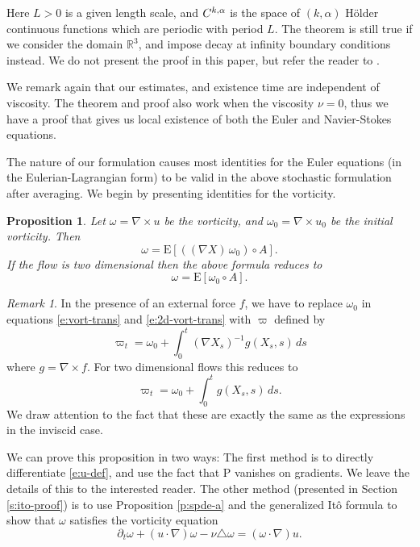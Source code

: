 \documentclass[final]{amsart}%
\newcommand{\del}{\partial}
\newcommand{\lap}{\triangle}
\newcommand{\inv}{^{-1}}
\newcommand{\grad}{\nabla}
\newcommand{\curl}{\grad \times}
\newcommand{\E}{\boldsymbol{\mathrm{E}}}
\newcommand{\lhp}{\boldsymbol{\mathrm{P}}}
\newcommand{\D}[2][u]{\del_t #2 + \left(#1 \cdot \grad\right) #2 - \nu \lap #2}
\newcommand{\R}{\mathbb{R}}
\newcommand{\holderspace}[2]{\ensuremath{C^{\ifx0#1{#2}\else{#1,#2}\fi}}}
\numberwithin{equation}{section}
\newtheorem{prop}[theorem]{Proposition}
\theoremstyle{definition}
\theoremstyle{remark}
\newtheorem{rem}[theorem]{Remark}
\begin{document}
Here $L > 0$ is a given length scale, and \holderspace{k}{\alpha} is the space of $(k, \alpha)$ H\"older continuous functions which are periodic with period $L$. The theorem is still true if we consider the domain $\R^3$, and impose decay at infinity boundary conditions instead. We do not present the proof in this paper, but refer the reader to \cite{sperturb, thesis}.

We remark again that our estimates, and existence time are independent of viscosity. The theorem and proof also work when the viscosity $\nu = 0$, thus we have a proof that gives us local existence of both the Euler and Navier-Stokes equations.

The nature of our formulation causes most identities for the Euler equations (in the Eulerian-Lagrangian form) to be valid in the above stochastic formulation after averaging. We begin by presenting identities for the vorticity.

\begin{prop}\label{p:vort-rep}%
Let $\omega = \curl u$ be the vorticity, and $\omega_0 = \curl u_0$ be the initial vorticity. Then
\begin{equation}
\label{e:vort-trans} \omega = \E \left[ \left( (\grad X) \,\omega_0\right) \circ A \right].
\end{equation}
If the flow is two dimensional then the above formula reduces to
\begin{equation}
\label{e:2d-vort-trans} \omega = \E \left[\omega_0 \circ A\right].
\end{equation}
\end{prop}

\begin{rem}%
In the presence of an external force $f$, we have to replace $\omega_0$ in equations \eqref{e:vort-trans} and \eqref{e:2d-vort-trans} with $\varpi$ defined by
$$ \varpi_t = \omega_0 + \int_0^t (\grad X_s)\inv g(X_s, s) \, ds$$
where $g = \curl f$. For two dimensional flows this reduces to
$$ \varpi_t = \omega_0 + \int_0^t g(X_s, s) \, ds.$$
We draw attention to the fact that these are exactly the same as the expressions in the inviscid case.
\end{rem}%

We can prove this proposition in two ways: The first method is to directly differentiate \eqref{e:u-def}, and use the fact that $\lhp$ vanishes on gradients. We leave the details of this to the interested reader. The other method (presented in Section \ref{s:ito-proof}) is to use Proposition \ref{p:spde-a} and the generalized It\^o formula to show that $\omega$ satisfies the vorticity equation
\begin{equation}
\label{e:vort-evol}\D{\omega} = (\omega \cdot \grad) u.
\end{equation}
\end{document}
